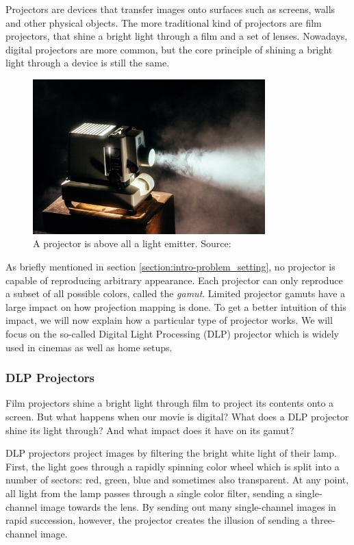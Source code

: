 Projectors are devices that transfer images onto surfaces such as screens, walls and other physical objects. The more traditional kind of projectors are film projectors, that shine a bright light through a film and a set of lenses. Nowadays, digital projectors are more common, but the core principle of shining a bright light through a device is still the same.

\begin{figure}[ht]
    \centering
    \includegraphics[width=0.8\textwidth]{images/02-projector.jpg}
    \caption{A projector is above all a light emitter. Source: \citet{ImageProjector}}
    \label{fig:background_projector}
\end{figure}

As briefly mentioned in section \ref{section:intro-problem_setting}, no projector is capable of reproducing arbitrary appearance. Each projector can only reproduce a subset of all possible colors, called the \textit{gamut}. Limited projector gamuts have a large impact on how projection mapping is done. To get a better intuition of this impact, we will now explain how a particular type of projector works. We will focus on the so-called Digital Light Processing (DLP) projector which is widely used in cinemas as well as home setups.

\subsubsection{DLP Projectors}
\label{section:background-projection_mapping-projectors-DLP}

Film projectors shine a bright light through film to project its contents onto a screen. But what happens when our movie is digital? What does a DLP projector shine its light through? And what impact does it have on its gamut?

DLP projectors project images by filtering the bright white light of their lamp. First, the light goes through a rapidly spinning color wheel which is split into a number of sectors: red, green, blue and sometimes also transparent. At any point, all light from the lamp passes through a single color filter, sending a single-channel image towards the lens. By sending out many single-channel images in rapid succession, however, the projector creates the illusion of sending a three-channel image.

